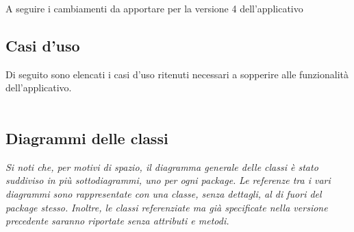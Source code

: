 A seguire i cambiamenti da apportare per la versione 4 dell'applicativo

\subsection{Casi d'uso}
Di seguito sono elencati i casi d'uso ritenuti necessari a sopperire alle funzionalità
dell'applicativo.
\\\\






\pagebreak


\pagebreak
\subsection{Diagrammi delle classi}

\textit{Si noti che, per motivi di spazio, il diagramma generale delle classi è stato suddiviso in più sottodiagrammi, uno per ogni package.}
\textit{Le referenze tra i vari diagrammi sono rappresentate con una classe, senza dettagli, al di fuori del package stesso.}
\textit{Inoltre, le classi referenziate ma già specificate nella versione precedente saranno riportate senza attributi e metodi.}




